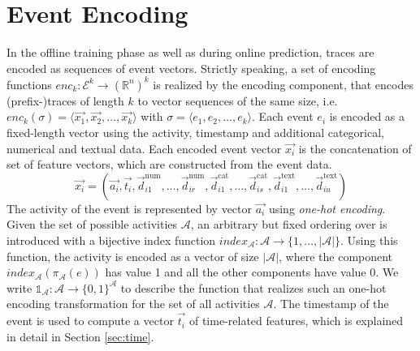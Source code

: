 \section{Event Encoding}

In the offline training phase as well as during online prediction, traces are encoded as sequences of event vectors.
Strictly speaking, a set of encoding functions  $enc_k \colon \mathcal{E}^k \to (\mathbb{R}^n)^k$ is realized by the encoding component, that encodes (prefix-)traces of length $k$ to vector sequences of the same size, i.e. $enc_k(\sigma) = \langle \vec{x_1}, \vec{x_2}, \dots, \vec{x_k}\rangle$ with $\sigma = \langle e_1, e_2, \dots, e_k\rangle$.
Each event $e_i$ is encoded as a fixed-length vector using the activity, timestamp and additional categorical, numerical and textual data.
Each encoded event vector $\vec{x_i}$ is the concatenation of set of feature vectors, which are constructed from the event data.
\begin{equation*}
\vec{x_i}=(
\vec{a_i},
\vec{t_i},
\vec{d}_{i1}^\mathrm{num}, \dots,\vec{d}_{ir}^\mathrm{num},
\vec{d}_{i1}^\mathrm{cat}, \dots,\vec{d}_{is}^\mathrm{cat},
\vec{d}_{i1}^\mathrm{text}, \dots, \vec{d}_{iu}^\mathrm{text})
\end{equation*}
The activity of the event is represented by vector $\vec{a_i}$ using \textit{one-hot encoding}.
Given the set of possible activities $\mathcal{A}$, an arbitrary but fixed ordering over is introduced with a bijective index function $index_\mathcal{A} \colon \mathcal{A} \to \{1, \dots, |\mathcal{A}|\}$.
Using this function, the activity is encoded as a vector of size $|\mathcal{A}|$, where the component $index_\mathcal{A}(\pi_\mathcal{A}(e))$ has value 1 and all the other components have value 0.
We write $\mathds{1}_\mathcal{A}\colon \mathcal{A} \to \{0,1\}^\mathcal{A}$ to describe the function that realizes such an one-hot encoding transformation for the set of all activities $\mathcal{A}$.
The timestamp of the event is used to compute a vector $\vec{t_i}$ of time-related features, which is explained in detail in Section \ref*{sec:time}.

